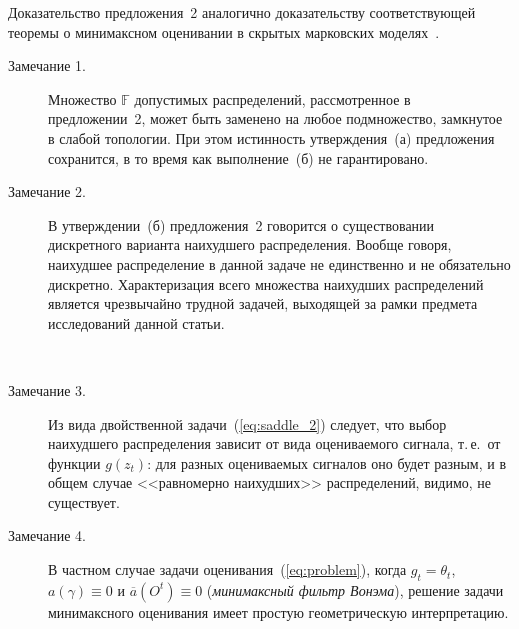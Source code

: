 \begin{multicols}{2}
Доказательство предложения~2 аналогично
доказательству соответствующей теоремы о минимаксном оценивании в
скрытых марковских моделях~\cite{bor_2007_2}.
 \begin{description}
\item[Замечание 1.] Множество $\mathbb{F}$ допустимых распределений, рассмотренное в
 предложении~2, может быть заменено на любое
 подмножество, замкнутое в слабой топологии.
 При этом истинность утверждения~(а) предложения сохранится, в
 то время как выполнение~(б) не гарантировано.
\item[Замечание 2.]
 В утверждении~(б) предложения~2 говорится о существовании
 дискретного варианта наихудшего распределения. Вообще говоря,
 наихудшее распределение в данной задаче не единственно и не
 обязательно дискретно. Характеризация всего множества наихудших
 распределений является чрезвычайно трудной зада\-чей, выходящей за
 рамки предмета исследований данной статьи.
 \begin{figure*}%
\vspace*{1pt}
\begin{center}
\mbox{%
\epsfxsize=123.911mm
}
\end{center}
\vspace*{-9pt}
 \vspace*{-3pt}
\end{figure*}

\item[Замечание 3.]
 Из вида двойственной задачи~(\ref{eq:saddle_2}) следует, что
 выбор наихудшего распределения зависит от вида оцениваемого
 сигнала, т.\,е.\ от функции $g(z_t)$: для разных оцениваемых сигналов
 оно будет разным, и в общем случае <<равномерно наихудших>>
 распределений, видимо, не существует.
\item[Замечание 4.]
 В частном случае задачи оценивания~(\ref{eq:problem}), когда
 $g_t=\theta_t$, $a(\gamma)\equiv 0$ и $\overline{a}(O^t)\equiv 0$ (\emph{минимаксный фильтр
 Вонэма}),
 решение задачи минимаксного оценивания имеет простую геометрическую интерпретацию.
 \end{description}


\end{multicols}
